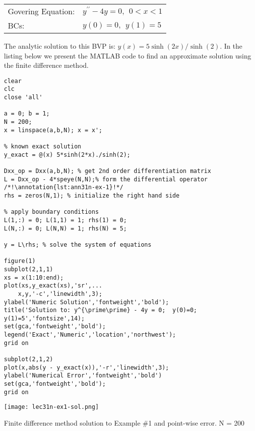 \begin{table}
\begin{tabular}{l l}
Govering Equation: & $y^{\prime \prime} -4y = 0, \ \ 0 < x < 1$ \\
BCs: & $y(0) = 0, \ \ y(1) = 5$ \\
\end{tabular}
\end{table}

\vspace{0.25cm}

\noindent The analytic solution to this BVP is: $y(x) = 5\sinh{(2x)}/\sinh{(2)}$.  In the listing below we present the MATLAB code to find an approximate solution using the finite difference method.

\setcounter{lstannotation}{0}

\begin{lstlisting}[style=myMatlab,name=lec31n-ex1]
clear
clc
close 'all'

a = 0; b = 1;
N = 200;
x = linspace(a,b,N); x = x';

% known exact solution
y_exact = @(x) 5*sinh(2*x)./sinh(2);

Dxx_op = Dxx(a,b,N); % get 2nd order differentiation matrix
L = Dxx_op - 4*speye(N,N);% form the differential operator /*!\annotation{lst:ann31n-ex-1}!*/
rhs = zeros(N,1); % initialize the right hand side

% apply boundary conditions
L(1,:) = 0; L(1,1) = 1; rhs(1) = 0; 
L(N,:) = 0; L(N,N) = 1; rhs(N) = 5;

y = L\rhs; % solve the system of equations

figure(1)
subplot(2,1,1)
xs = x(1:10:end);
plot(xs,y_exact(xs),'sr',...
    x,y,'-c','linewidth',3);
ylabel('Numeric Solution','fontweight','bold');
title('Solution to: y^{\prime\prime} - 4y = 0;  y(0)=0; y(1)=5','fontsize',14);
set(gca,'fontweight','bold');
legend('Exact','Numeric','location','northwest');
grid on

subplot(2,1,2)
plot(x,abs(y - y_exact(x)),'-r','linewidth',3);
ylabel('Numerical Error','fontweight','bold')
set(gca,'fontweight','bold');
grid on
\end{lstlisting}
\begin{marginfigure}[-10.0cm]
\texttt{[image: lec31n-ex1-sol.png]}
\caption{Finite difference method solution to Example \#1 and point-wise error. N = 200}
\label{fig:lec31n-ex1-sol}
\end{marginfigure}

